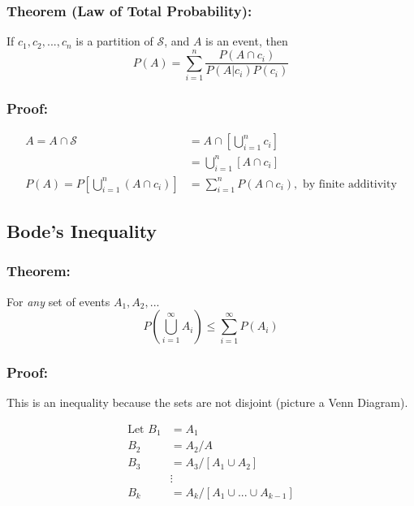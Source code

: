 \documentclass{article}
\begin{document}
\subsubsection*{Theorem (Law of Total Probability):}

If $c_1, c_2,..., c_n$ is a partition of $\mathcal{S}$, and $A$ is an event, then
\begin{equation*}
    P(A) = \sum_{i=1}^n \frac{P(A \cap c_i)}{P(A|c_i) P(c_i)}
\end{equation*}

\subsubsection*{Proof:}
\begin{equation*}
    \begin{split}
        A = A \cap \mathcal{S} &= A \cap \left[\bigcup_{i=1}^n c_i \right]\\
        &= \bigcup_{i=1}^n [A \cap c_i]\\
        P(A) = P\left[\bigcup_{i=1}^n (A\cap c_i) \right] &= \sum_{i=1}^n P(A \cap c_i), \text{ by finite additivity}
    \end{split}
\end{equation*}

\subsection{Bode's Inequality}
\subsubsection*{Theorem:}
For \textit{any} set of events $A_1, A_2,...$
\begin{equation*}
    P\left(\bigcup_{i=1}^\infty A_i \right) \leq \sum_{i=1}^\infty P(A_i)
\end{equation*}

\subsubsection*{Proof:}

This is an inequality because the sets are not disjoint (picture a Venn Diagram).

\begin{equation*}
    \begin{split}
        \text{Let } B_1 &= A_1\\
        B_2 &= A_2/A\\
        B_3 &= A_3/[A_1\cup A_2]\\
            &\vdots\\
        B_k &= A_k / [A_1\cup ... \cup A_{k-1}]
    \end{split}
\end{equation*}
\end{document}
